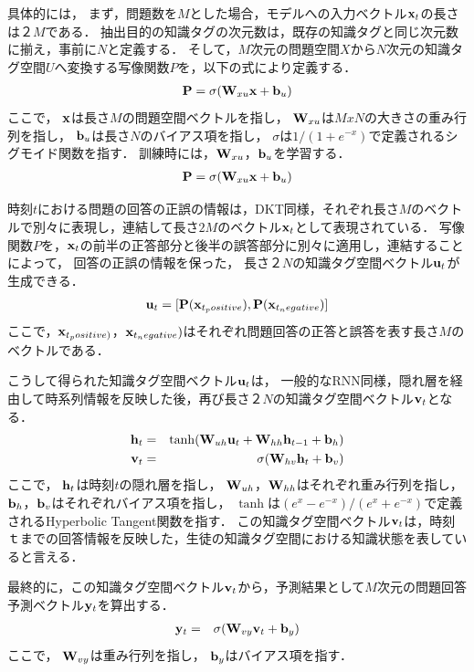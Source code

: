 具体的には，
まず，問題数を$M$とした場合，モデルへの入力ベクトル${\bf x}_t$の長さは$２M$である．
抽出目的の知識タグの次元数は，既存の知識タグと同じ次元数に揃え，事前に$N$と定義する．
そして，$M$次元の問題空間$X$から$N$次元の知識タグ空間$U$へ変換する写像関数$P$を，以下の式により定義する．
\begin{eqnarray}
{\bf P} = \sigma( {\bf W}_{xu} {\bf x} + {\bf b}_u)
\end{eqnarray}
ここで，
${\bf x}$は長さ$M$の問題空間ベクトルを指し，
${\bf W}_{xu}$は$MxN$の大きさの重み行列を指し，
${\bf b}_u$は長さ$N$のバイアス項を指し，
$\sigma$は$1 / (1 + e^{-x})$で定義されるシグモイド関数を指す．
訓練時には，${\bf W}_{xu}$，${\bf b}_u$を学習する．
\begin{eqnarray}
\label{eq:encode}
{\bf P} = \sigma( {\bf W}_{xu} {\bf x} + {\bf b}_u)
\end{eqnarray}

時刻$t$における問題の回答の正誤の情報は，DKT同様，それぞれ長さ$M$のベクトルで別々に表現し，連結して長さ$2M$のベクトル${\bf x}_t$として表現されている．
写像関数$P$を，${\bf x}_t$の前半の正答部分と後半の誤答部分に別々に適用し，連結することによって，
回答の正誤の情報を保った，
長さ$２N$の知識タグ空間ベクトル${\bf u}_t$が生成できる．
\begin{eqnarray}
{\bf u}_t = [{\bf P}({\bf x}_{t_positive}), {\bf P}({\bf x}_{t_negative})]
\end{eqnarray}
ここで，${\bf x}_{t_positive)}$，${\bf x}_{t_negative})$はそれぞれ問題回答の正答と誤答を表す長さ$M$のベクトルである．

こうして得られた知識タグ空間ベクトル${\bf u}_t$は，
一般的なRNN同様，隠れ層を経由して時系列情報を反映した後，再び長さ$２N$の知識タグ空間ベクトル${\bf v}_t$となる．
\begin{eqnarray}
{\bf h}_t &=& \tanh({\bf W}_{uh} {\bf u}_t + {\bf W}_{hh}  {\bf h}_{t-1} + {\bf b}_h)\\
{\bf v}_t &=& \sigma( {\bf W}_{hv} {\bf h}_t + {\bf b}_v)
\end{eqnarray}
ここで，
${\bf h}_t$は時刻$t$の隠れ層を指し，
${\bf W}_{uh}$，${\bf W}_{hh}$はそれぞれ重み行列を指し，
${\bf b}_h$，${\bf b}_v$はそれぞれバイアス項を指し，
$\tanh$は$( e^x - e^{-x} )/( e^x + e^{-x} )$で定義されるHyperbolic Tangent関数を指す．
この知識タグ空間ベクトル${\bf v}_t$は，時刻$ｔ$までの回答情報を反映した，生徒の知識タグ空間における知識状態を表していると言える．

最終的に，この知識タグ空間ベクトル${\bf v}_t$から，予測結果として$M$次元の問題回答予測ベクトル${\bf y}_t$を算出する．
\begin{eqnarray}
{\bf y}_t &=& \sigma( {\bf W}_{vy} {\bf v}_t + {\bf b}_y)
\end{eqnarray}
ここで，
${\bf W}_{vy}$は重み行列を指し，
${\bf b}_y$はバイアス項を指す．

